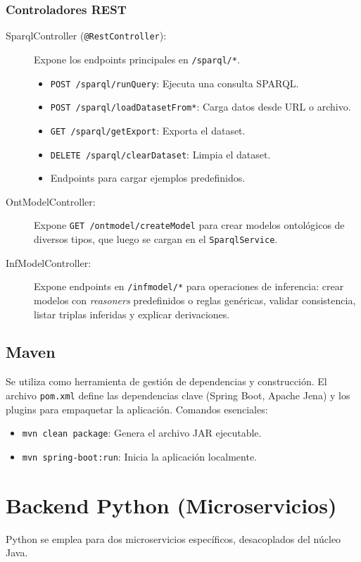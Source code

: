 \documentclass{article}
\begin{document}
\subsubsection{Controladores REST}
\begin{description}
    \item[SparqlController (\texttt{@RestController}):] Expone los endpoints principales en \texttt{/sparql/*}.
    \begin{itemize}
        \item \texttt{POST /sparql/runQuery}: Ejecuta una consulta SPARQL.
        \item \texttt{POST /sparql/loadDatasetFrom*}: Carga datos desde URL o archivo.
        \item \texttt{GET /sparql/getExport}: Exporta el dataset.
        \item \texttt{DELETE /sparql/clearDataset}: Limpia el dataset.
        \item Endpoints para cargar ejemplos predefinidos.
    \end{itemize}
    \item[OntModelController:] Expone \texttt{GET /ontmodel/createModel} para crear modelos ontológicos de diversos tipos, que luego se cargan en el \texttt{SparqlService}.
    \item[InfModelController:] Expone endpoints en \texttt{/infmodel/*} para operaciones de inferencia: crear modelos con \textit{reasoners} predefinidos o reglas genéricas, validar consistencia, listar triplas inferidas y explicar derivaciones.
\end{description}

\subsection{Maven}
Se utiliza como herramienta de gestión de dependencias y construcción. El archivo \texttt{pom.xml} define las dependencias clave (Spring Boot, Apache Jena) y los plugins para empaquetar la aplicación. Comandos esenciales:
\begin{itemize}
    \item \texttt{mvn clean package}: Genera el archivo JAR ejecutable.
    \item \texttt{mvn spring-boot:run}: Inicia la aplicación localmente.
\end{itemize}

\section{Backend Python (Microservicios)}
Python se emplea para dos microservicios específicos, desacoplados del núcleo Java.
\end{document}
